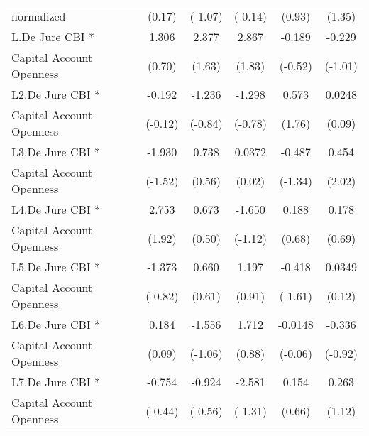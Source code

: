 {\begin{tabular}{l*{5}{c}}
normalized          &      (0.17)         &     (-1.07)         &     (-0.14)         &      (0.93)         &      (1.35)         \\
[1em]
L.De Jure CBI *     &       1.306         &       2.377         &       2.867         &      -0.189         &      -0.229         \\
Capital Account Openness&      (0.70)         &      (1.63)         &      (1.83)         &     (-0.52)         &     (-1.01)         \\
[1em]
L2.De Jure CBI *    &      -0.192         &      -1.236         &      -1.298         &       0.573         &      0.0248         \\
Capital Account Openness&     (-0.12)         &     (-0.84)         &     (-0.78)         &      (1.76)         &      (0.09)         \\
[1em]
L3.De Jure CBI *    &      -1.930         &       0.738         &      0.0372         &      -0.487         &       0.454\sym{*}  \\
Capital Account Openness&     (-1.52)         &      (0.56)         &      (0.02)         &     (-1.34)         &      (2.02)         \\
[1em]
L4.De Jure CBI *    &       2.753         &       0.673         &      -1.650         &       0.188         &       0.178         \\
Capital Account Openness&      (1.92)         &      (0.50)         &     (-1.12)         &      (0.68)         &      (0.69)         \\
[1em]
L5.De Jure CBI *    &      -1.373         &       0.660         &       1.197         &      -0.418         &      0.0349         \\
Capital Account Openness&     (-0.82)         &      (0.61)         &      (0.91)         &     (-1.61)         &      (0.12)         \\
[1em]
L6.De Jure CBI *    &       0.184         &      -1.556         &       1.712         &     -0.0148         &      -0.336         \\
Capital Account Openness&      (0.09)         &     (-1.06)         &      (0.88)         &     (-0.06)         &     (-0.92)         \\
[1em]
L7.De Jure CBI *    &      -0.754         &      -0.924         &      -2.581         &       0.154         &       0.263         \\
Capital Account Openness&     (-0.44)         &     (-0.56)         &     (-1.31)         &      (0.66)         &      (1.12)         \\

\end{tabular}}
